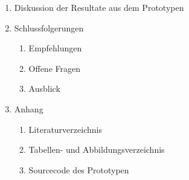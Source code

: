 \documentclass{hwz}
\begin{document}
{\begin{enumerate}[topsep=0pt,itemsep=2pt,partopsep=4pt, parsep=4pt]
\begin{enumerate}[topsep=0pt,itemsep=2pt,partopsep=4pt, parsep=4pt]
\begin{enumerate}[topsep=0pt,itemsep=2pt,partopsep=4pt, parsep=4pt]
                \item Format und Qualität der Rechnungen
                \item Erwartetes Format und Qualität der Resultate
            \end{enumerate}
            \item Texterkennung durch LSTM Netzwerk
            \item Optimierung der Resultate der Texterkennung
            \begin{enumerate}[topsep=0pt,itemsep=2pt,partopsep=4pt, parsep=4pt]
                \item Fehlerkorrektur durch Rechtschreib- und Grammatikprüfung mit einem LSTM Netzwerk
            \end{enumerate}
            \item Informationsextraktion aus den OCR Resultaten
            \begin{enumerate}[topsep=0pt,itemsep=2pt,partopsep=4pt, parsep=4pt]
                \item Named Entity Recognition and Classification
                \item Text classificiation
                \item Extraktion aus standardisierten, semi-strukturierten Formaten
            \end{enumerate}
            \item Zusammenfassung der Resultate
        \end{enumerate}
        \item Diskussion der Resultate aus dem Prototypen
        \item Schlussfolgerungen
        \begin{enumerate}[topsep=0pt,itemsep=2pt,partopsep=4pt, parsep=4pt]
            \item Empfehlungen
            \item Offene Fragen
            \item Ausblick
        \end{enumerate}
        \item Anhang
        \begin{enumerate}[topsep=0pt,itemsep=2pt,partopsep=4pt, parsep=4pt]
            \item Literaturverzeichnis
            \item Tabellen- und Abbildungsverzeichnis
            \item Sourcecode des Prototypen
        \end{enumerate}
    \end{enumerate}
}
\end{document}
